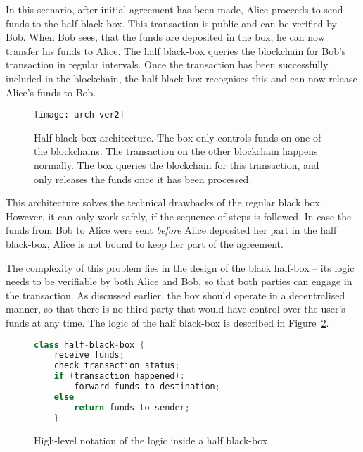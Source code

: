 In this scenario, after initial agreement has been made, Alice proceeds to send funds to the half black-box. This transaction is public and can be verified by Bob. When Bob sees, that the funds are deposited in the box, he can now transfer his funds to Alice. The half black-box queries the blockchain for Bob's transaction in regular intervals. Once the transaction has been successfully included in the blockchain, the half black-box recognises this and can now release Alice's funds to Bob.
% 
\begin{figure}[ht]
    \centering
    \texttt{[image: arch-ver2]}
    \caption{Half black-box architecture. The box only controls funds on one of the blockchains. The transaction on the other blockchain happens normally. The box queries the blockchain for this transaction, and only releases the funds once it has been processed.}
    \label{fig:arch-ver2}
\end{figure}

This architecture solves the technical drawbacks of the regular black box. However, it can only work safely, if the sequence of steps is followed. In case the funds from Bob to Alice were sent \textit{before} Alice deposited her part in the half black-box, Alice is not bound to keep her part of the agreement.

The complexity of this problem lies in the design of the black half-box -- its logic needs to be verifiable by both Alice and Bob, so that both parties can engage in the transaction. As discussed earlier, the box should operate in a decentralised manner, so that there is no third party that would have control over the user's funds at any time. The logic of the half black-box is described in Figure~\ref{fig:simple-logic}.

\begin{figure}[ht]
    \begin{framed}
    \begin{lstlisting}[language=java]
class half-black-box {
	receive funds;
	check transaction status;
	if (transaction happened):
		forward funds to destination;
	else
		return funds to sender;
	}
    \end{lstlisting}
    \end{framed}
    \caption{High-level notation of the logic inside a half black-box.}
    \label{fig:simple-logic}
\end{figure}

